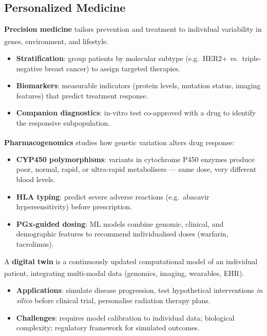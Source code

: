 \subsection{Personalized Medicine}

\begin{tcbitemize}[ skin=sectionraster ]
    \tcbitem[title={Precision Medicine}, raster multicolumn=3]
    \textbf{Precision medicine} tailors prevention and treatment to individual variability in genes, environment, and lifestyle\textsuperscript{\cite[][pp.~3--18]{bocciaPersonalisedHealthCare2020}}.
    \begin{itemize}
        \item \textbf{Stratification}: group patients by molecular subtype (e.g.\ HER2+ vs.\ triple-negative breast cancer) to assign targeted therapies.
        \item \textbf{Biomarkers}: measurable indicators (protein levels, mutation status, imaging features) that predict treatment response.
        \item \textbf{Companion diagnostics}: in-vitro test co-approved with a drug to identify the responsive subpopulation.
    \end{itemize}

    \tcbitem[title={Pharmacogenomics}, raster multicolumn=3]
    \textbf{Pharmacogenomics} studies how genetic variation alters drug response\textsuperscript{\cite[][pp.~50--75]{bocciaPersonalisedHealthCare2020}}:
    \begin{itemize}
        \item \textbf{CYP450 polymorphisms}: variants in cytochrome P450 enzymes produce poor, normal, rapid, or ultra-rapid metabolisers — same dose, very different blood levels.
        \item \textbf{HLA typing}: predict severe adverse reactions (e.g.\ abacavir hypersensitivity) before prescription.
        \item \textbf{PGx-guided dosing}: ML models combine genomic, clinical, and demographic features to recommend individualised doses (warfarin, tacrolimus).
    \end{itemize}

    \tcbitem[title={Digital Twins in Healthcare}, raster multicolumn=3]
    A \textbf{digital twin} is a continuously updated computational model of an individual patient, integrating multi-modal data (genomics, imaging, wearables, EHR)\textsuperscript{\cite[][pp.~110--130]{bocciaPersonalisedHealthCare2020}}.
    \begin{itemize}
        \item \textbf{Applications}: simulate disease progression, test hypothetical interventions \textit{in silico} before clinical trial, personalise radiation therapy plans.
        \item \textbf{Challenges}: requires model calibration to individual data; biological complexity; regulatory framework for simulated outcomes.
    \end{itemize}


\end{tcbitemize}
